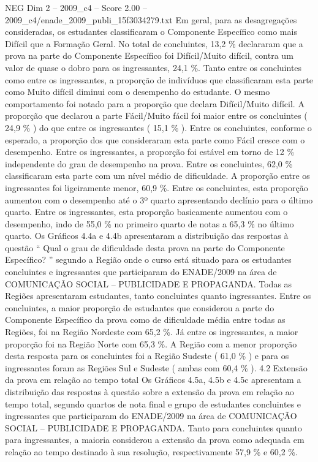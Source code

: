 \begin{textsample}{NEG Dim 2 – 2009\_c4 – Score 2.00 – 2009\_c4/enade\_2009\_publi\_15f3034279.txt}
Em geral, para as desagregações consideradas, os estudantes classificaram o Componente Específico como mais Difícil que a Formação Geral.
No total de concluintes, 13,2 \% declararam que a prova na parte do Componente Específico foi Difícil/Muito difícil, contra um valor de quase o dobro para os ingressantes, 24,1 \%.
Tanto entre os concluintes como entre os ingressantes, a proporção de indivíduos que classificaram esta parte como Muito difícil diminui com o desempenho do estudante.
O mesmo comportamento foi notado para a proporção que declara Difícil/Muito difícil.
A proporção que declarou a parte Fácil/Muito fácil foi maior entre os concluintes ( 24,9 \% ) do que entre os ingressantes ( 15,1 \% ).
Entre os concluintes, conforme o esperado, a proporção dos que consideraram esta parte como Fácil cresce com o desempenho.
Entre os ingressantes, a proporção foi estável em torno de 12 \% independente do grau de desempenho na prova.
Entre os concluintes, 62,0 \% classificaram esta parte com um nível médio de dificuldade.
A proporção entre os ingressantes foi ligeiramente menor, 60,9 \%.
Entre os concluintes, esta proporção aumentou com o desempenho até o 3º quarto apresentando declínio para o último quarto.
Entre os ingressantes, esta proporção basicamente aumentou com o desempenho, indo de 55,0 \% no primeiro quarto de notas a 65,3 \% no último quarto.
Os Gráficos 4.4a e 4.4b apresentaram a distribuição das respostas à questão “ Qual o grau de dificuldade desta prova na parte do Componente Específico? ” segundo a Região onde o curso está situado para os estudantes concluintes e ingressantes que participaram do ENADE/2009 na área de COMUNICAÇÃO SOCIAL – PUBLICIDADE E PROPAGANDA.
Todas as Regiões apresentaram estudantes, tanto concluintes quanto ingressantes.
Entre os concluintes, a maior proporção de estudantes que considerou a parte do Componente Específico da prova como de dificuldade média entre todas as Regiões, foi na Região Nordeste com 65,2 \%.
Já entre os ingressantes, a maior proporção foi na Região Norte com 65,3 \%.
A Região com a menor proporção desta resposta para os concluintes foi a Região Sudeste ( 61,0 \% ) e para os ingressantes foram as Regiões Sul e Sudeste ( ambas com 60,4 \% ). 4.2 Extensão da prova em relação ao tempo total Os Gráficos 4.5a, 4.5b e 4.5c apresentam a distribuição das respostas à questão sobre a extensão da prova em relação ao tempo total, segundo quartos de nota final e grupo de estudantes concluintes e ingressantes que participaram do ENADE/2009 na área de COMUNICAÇÃO SOCIAL – PUBLICIDADE E PROPAGANDA.
Tanto para concluintes quanto para ingressantes, a maioria considerou a extensão da prova como adequada em relação ao tempo destinado à sua resolução, respectivamente 57,9 \% e 60,2 \%.

\end{textsample}

